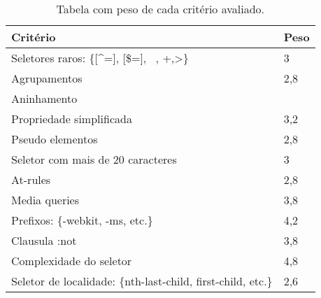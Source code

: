 \begin{table}[!htb]
	\centering
	\caption{Tabela com peso de cada critério avaliado.}
	\label{tab:tabelaPesos}
	\begin{tabular}{l|l}
		\textbf{Critério}                                                           & \textbf{Peso} \\ \hline
		Seletores raros: \{{[}\textasciicircum ={]}, {[}\$={]}, ~, +,\textgreater\} & 3             \\
		Agrupamentos                                                                & 2,8           \\
		Aninhamento                                                                 &               \\
		Propriedade simplificada                                                    & 3,2           \\
		Pseudo elementos                                                            & 2,8           \\
		Seletor com mais de 20 caracteres                                           & 3             \\
		At-rules                                                                    & 2,8           \\
		Media queries                                                               & 3,8           \\
		Prefixos: \{-webkit, -ms, etc.\}                                            & 4,2           \\
		Clausula :not                                                               & 3,8           \\
		Complexidade do seletor                                                     & 4,8           \\
		Seletor de localidade: \{nth-last-child, first-child, etc.\}                & 2,6          
	\end{tabular}
\end{table}